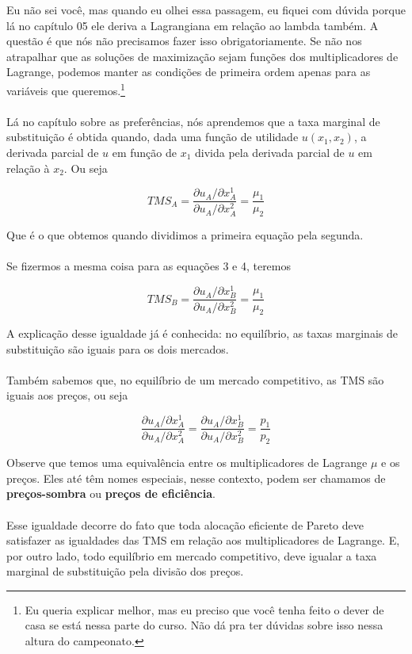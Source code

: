 \documentclass[a4paper,11pt,oneside]{book}
\theoremstyle{definition}
\theoremstyle{break}
\begin{document}
Eu não sei você, mas quando eu olhei essa passagem, eu fiquei com dúvida porque lá no capítulo 05 ele deriva a Lagrangiana em relação ao lambda também. A questão é que nós não precisamos fazer isso obrigatoriamente. Se não nos atrapalhar que as soluções de maximização sejam funções dos multiplicadores de Lagrange, podemos manter as condições de primeira ordem apenas para as variáveis que queremos.\footnote{Eu queria explicar melhor, mas eu preciso que você tenha feito o dever de casa se está nessa parte do curso. Não dá pra ter dúvidas sobre isso nessa altura do campeonato.}
\\~\\
Lá no capítulo sobre as preferências, nós aprendemos que a taxa marginal de substituição é obtida quando, dada uma função de utilidade $u(x_1,x_2)$, a derivada parcial de $u$ em função de $x_{1}$ divida pela derivada parcial de $u$ em relação à $x_{2}$. Ou seja

$$TMS_{A} = \frac{\partial u_A / \partial x_{A}^1 }{\partial u_A / \partial x_{A}^2} = \frac{\mu_{1} }{ \mu_{2} }$$

Que é o que obtemos quando dividimos a primeira equação pela segunda.
\\~\\
Se fizermos a mesma coisa para as equações 3 e 4, teremos

$$TMS_{B} = \frac{\partial u_A / \partial x_{B}^1 }{\partial u_A / \partial x_{B}^2} = \frac{\mu_{1} }{ \mu_{2} }$$

A explicação desse igualdade já é conhecida: no equilíbrio, as taxas marginais de substituição são iguais para os dois mercados.
\\~\\
Também sabemos que, no equilíbrio de um mercado competitivo, as TMS são iguais aos preços, ou seja

$$	\frac{\partial u_A / \partial x_{A}^1 }{\partial u_A / \partial x_{A}^2} = \frac{\partial u_A / \partial x_{B}^1 }{\partial u_A / \partial x_{B}^2} = \frac{ p_{1} }{ p_{2} } $$

Observe que temos uma equivalência entre os multiplicadores de Lagrange $\mu$ e os preços. Eles até têm nomes especiais, nesse contexto, podem ser chamamos de \textbf{preços-sombra} ou \textbf{preços de eficiência}.
\\~\\
Esse igualdade decorre do fato que toda alocação eficiente de Pareto deve satisfazer as igualdades das TMS em relação aos multiplicadores de Lagrange. E, por outro lado, todo equilíbrio em mercado competitivo, deve igualar a taxa marginal de substituição pela divisão dos preços.
\end{document}
